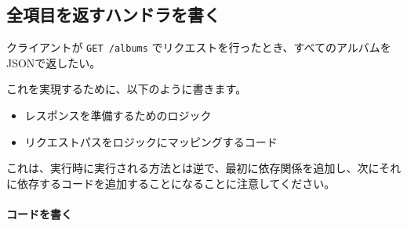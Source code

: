 

\subsection{全項目を返すハンドラを書く}

クライアントが \texttt{GET\ /albums}
でリクエストを行ったとき、すべてのアルバムをJSONで返したい。

これを実現するために、以下のように書きます。

\begin{itemize}
\item
  レスポンスを準備するためのロジック
\item
  リクエストパスをロジックにマッピングするコード
\end{itemize}

これは、実行時に実行される方法とは逆で、最初に依存関係を追加し、次にそれに依存するコードを追加することになることに注意してください。


\paragraph{コードを書く}

